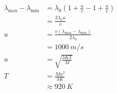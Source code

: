 \documentclass{article}
\begin{document}
\subsection{}

\begin{align*}
  \lambda_\text{max} - \lambda_\text{min} & = \lambda_0 \left( 1 + \frac{u}{v} - 1 + \frac{u}{v} \right)      \\
                                          & = \frac{2 \lambda_0 u}{v}                                         \\
  u                                       & = \frac{v (\lambda_\text{max} - \lambda_\text{min})}{2 \lambda_0} \\
                                          & = \qty{1000}{m/s}                                                 \\
  u                                       & = \sqrt{\frac{3 K T}{M}}                                          \\
  T                                       & = \frac{M u^2}{3 K}                                               \\
                                          & \approx \qty{920}{K}
\end{align*}

\setcounter{subsection}{12}
\subsection{}
\end{document}
